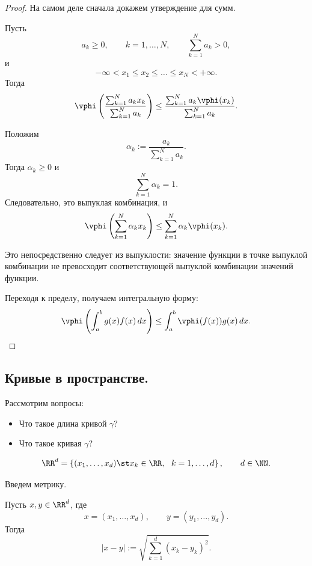 \begin{proof}
	На самом деле сначала докажем утверждение для сумм.
	
	Пусть
	\[
	a_k\ge 0,\qquad k=1,\ldots,N,\qquad \sum_{k=1}^N a_k>0,
	\]
	и
	\[
	-\infty < x_1 \le x_2 \le \ldots \le x_N < +\infty.
	\]
	Тогда
	\[
	\vphi\left(\frac{\sum_{k=1}^N a_kx_k}{\sum_{k=1}^N a_k}\right)
	\le
	\frac{\sum_{k=1}^N a_k\vphi(x_k)}{\sum_{k=1}^N a_k}.
	\]
	
	Положим
	\[
	\alpha_k:=\frac{a_k}{\sum_{k=1}^N a_k}.
	\]
	Тогда $\alpha_k\ge 0$ и
	\[
	\sum_{k=1}^N \alpha_k = 1.
	\]
	Следовательно, это выпуклая комбинация, и
	\[
	\vphi\left(\sum_{k=1}^N \alpha_k x_k\right)
	\le
	\sum_{k=1}^N \alpha_k \vphi(x_k).
	\]
	
	Это непосредственно следует из выпуклости: значение функции в точке выпуклой комбинации не превосходит соответствующей выпуклой комбинации значений функции.
	
	Переходя к пределу, получаем интегральную форму:
	\[
	\vphi\left(\int_a^b g(x)f(x)\,dx\right)
	\le
	\int_a^b \vphi(f(x))g(x)\,dx.
	\]
\end{proof}

\subsection{Кривые в пространстве.}

Рассмотрим вопросы:
\begin{itemize}
	\item Что такое длина кривой $\gamma$?
	\item Что такое кривая $\gamma$?
\end{itemize}

\[
\RR^d=\left\{(x_1,\ldots,x_d)\st x_k\in\RR,\ \ k=1,\ldots,d\right\},
\qquad d\in\NN.
\]

Введем метрику.

Пусть $x,y\in\RR^d$, где
\[
x=(x_1,\ldots,x_d),
\qquad
y=(y_1,\ldots,y_d).
\]
Тогда
\[
|x-y|:=\sqrt{\sum_{k=1}^d (x_k-y_k)^2}.
\]

